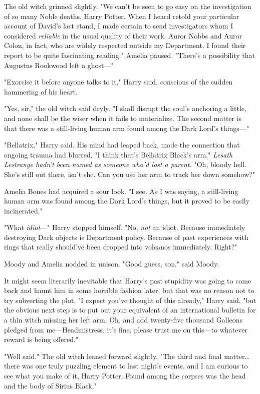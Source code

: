 The old witch grinned slightly. "We can't be seen to go easy on the
investigation of so many Noble deaths, Harry Potter. When I heard retold your
particular account of David's last stand, I made certain to send investigators
whom I considered \emph{reliable} in the usual quality of their work. Auror
Nobbs and Auror Colon, in fact, who are widely respected outside my Department.
I found their report to be quite fascinating reading." Amelia paused. "There's
a possibility that Augustus Rookwood left a ghost---"

"Exorcise it before anyone talks to it," Harry said, conscious of the sudden
hammering of his heart.

"Yes, sir," the old witch said dryly. "I shall disrupt the soul's anchoring a
little, and none shall be the wiser when it fails to materialize. The second
matter is that there was a still-living human arm found among the Dark Lord's
things---"

"Bellatrix," Harry said. His mind had leaped back, made the connection that
ongoing trauma had blurred. "I think that's Bellatrix Black's arm."
\emph{Lesath Lestrange hadn't been named as someone who'd lost a parent.} "Oh,
bloody hell. She's still out there, isn't she. Can you use her arm to track her
down somehow?"

Amelia Bones had acquired a sour look. "I see. As I was saying, a still-living
human arm was found among the Dark Lord's things, but it proved to be easily
incinerated."

"What \emph{idiot}---" Harry stopped himself. "No, \emph{not} an idiot. Because
immediately destroying Dark objects is Department policy. Because of past
experiences with rings that really should've been dropped into volcanos
immediately. Right?"

Moody and Amelia nodded in unison. "Good guess, son," said Moody.

It might seem literarily inevitable that Harry's past stupidity was going to
come back and haunt him in some horrible fashion later, but that was no reason
not to try subverting the plot. "I expect you've thought of this already,"
Harry said, "but the obvious next step is to put out your equivalent of an
international bulletin for a thin witch missing her left arm. Oh, and add
twenty-five thousand Galleons pledged from me---Headmistress, it's fine, please
trust me on this---to whatever reward is being offered."

"Well said." The old witch leaned forward slightly. "The third and final
matter…there was one truly puzzling element to last night's events, and
I am curious to see what you make of it, Harry Potter. Found among the corpses
was the head and the body of Sirius Black."

